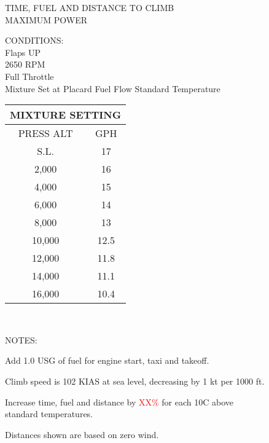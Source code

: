 \begin{figure}[t]
\begin{center}
\begin{perfhdr}TIME, FUEL AND DISTANCE TO CLIMB\\
MAXIMUM POWER\\
\end{perfhdr}
\Large
\normalsize \vspace{5ex} 
\begin{minipage}{4in}
  \begin{flushleft}
    CONDITIONS:\\
    Flaps UP\\
    2650 RPM\\
    Full Throttle\\
    Mixture Set at Placard Fuel Flow
    Standard Temperature\\

    \end{flushleft}
\end{minipage}
\hfill
\begin{minipage}{1.5in}
  \begin{tabular}{|c|c|}
    \hline
    \multicolumn{2}{|c|}{MIXTURE SETTING}\\
    \hline
    PRESS ALT&GPH\\
    \hline
    S.L.&17\\
    2,000&16\\
    4,000&15\\
    6,000&14\\
    8,000&13\\
    10,000&12.5\\
    12,000&11.8\\
    14,000&11.1\\
    16,000&10.4\\
    \hline
    \end{tabular}
  \end{minipage}
\\
\vspace{\perfnoteskip}
    \raggedright NOTES:
    \begin{enumerate*}
      \item Add 1.0 USG of fuel for engine start, taxi and takeoff.
      \item Climb speed is 102 KIAS at sea level, decreasing by 1 kt per 1000 ft.
      \item Increase time, fuel and distance by \textcolor{red}{XX\%} for each 10\textdegree C above standard
      temperatures.
      \item Distances shown are based on zero wind.
      \end{enumerate*}


\end{center}
\end{figure}
